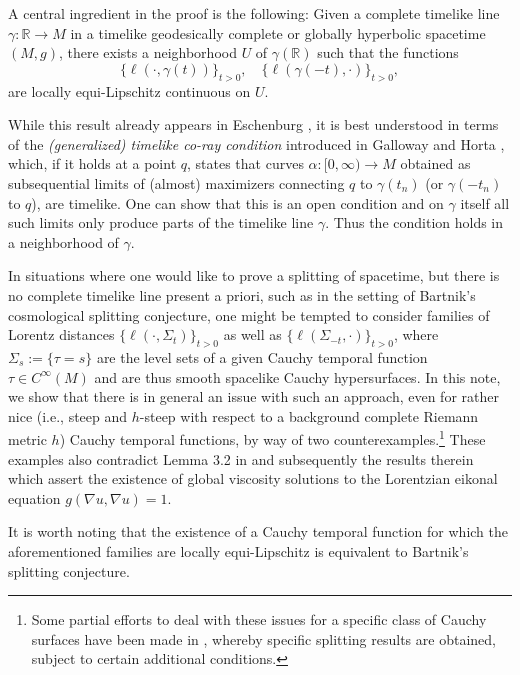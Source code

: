 \documentclass[a4paper,11pt]{article}
\numberwithin{equation}{section}
\theoremstyle{definition}
\theoremstyle{plain}
\newcommand{\R}{\mathbb R}
\begin{document}
A central ingredient in the proof is the following: Given a complete timelike line $\gamma: \R \to M$ in a timelike geodesically complete or globally hyperbolic spacetime $(M,g)$, there exists a neighborhood $U$ of $\gamma(\R)$ such that the functions
\begin{equation}
    \{\ell(\cdot, \gamma(t))\}_{t > 0}, \quad \{\ell(\gamma(-t),\cdot)\}_{t > 0},
\end{equation}
are {locally} equi-Lipschitz continuous on $U$.

While this result already appears in Eschenburg \cite{Eschenburg1988}, it is best understood in terms of the \emph{(generalized) timelike co-ray condition} introduced in Galloway and Horta \cite{GallowayHorta}, which, if it holds at a point $q$, states that curves $\alpha:[0,\infty) \to M$ obtained as subsequential limits of (almost) maximizers connecting $q$ to $\gamma(t_n)$ (or $\gamma(-t_n)$ to $q$), are timelike. One can show that this is an open condition and on $\gamma$ itself all such limits only produce parts of the timelike line $\gamma$. Thus the condition holds in a neighborhood of $\gamma$.

In situations where one would like to prove a splitting of spacetime, but there is no complete timelike line present a priori, such as in the setting of Bartnik's \cite{Bartnik1988} cosmological splitting conjecture, one might be tempted to consider families of Lorentz distances $\{\ell(\cdot,\Sigma_t)\}_{t > 0}$ as well as $\{\ell(\Sigma_{-t},\cdot)\}_{t > 0}$, where $\Sigma_s :=\{\tau = s\}$ are the level sets of a given Cauchy temporal function $\tau \in C^\infty(M)$ and are thus smooth spacelike Cauchy hypersurfaces. In this note, we show that there is in general an issue with such an approach, even for rather nice (i.e., steep and $h$-steep with respect to a background complete Riemann metric $h$) Cauchy temporal functions, by way of two counterexamples.\footnote{Some partial efforts to deal with these issues for a specific class of Cauchy surfaces have been made in \cite{GVAchronal, GVHausdorff}, whereby specific splitting results are obtained, subject to certain additional conditions.} These examples also contradict Lemma 3.2 in \cite{ZhuWuCui} and subsequently the results therein which assert the existence of global viscosity solutions to the Lorentzian eikonal equation $g(\nabla u,\nabla u) = 1$. 

It is worth noting that the existence of a Cauchy temporal function for which the aforementioned families are locally equi-Lipschitz is equivalent to Bartnik's splitting conjecture.
\end{document}
